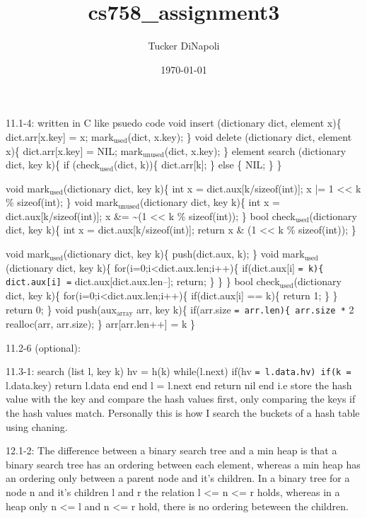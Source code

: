 \documentclass[11pt]{article}
\author{Tucker DiNapoli}
\date{\today}
\title{cs758\_assignment3}
\begin{document}
\maketitle
\tableofcontents

11.1-4: written in C like psuedo code
void insert (dictionary dict, element x)\{
  dict.arr[x.key] = x;
  mark$_{\text{used}}$(dict, x.key);
\}
void delete (dictionary dict, element x)\{
  dict.arr[x.key] = NIL;
  mark$_{\text{unused}}$(dict, x.key);
\}
element search (dictionary dict, key k)\{
  if (check$_{\text{used}}$(dict, k))\{
    dict.arr[k];
  \} else \{
    NIL;
  \}
\}


void mark$_{\text{used}}$(dictionary dict, key k)\{
  int x = dict.aux[k/sizeof(int)];
  x |= 1 << k \% sizeof(int);
\}
void mark$_{\text{unused}}$(dictionary dict, key k)\{
  int x = dict.aux[k/sizeof(int)];
  x \&=  \textasciitilde{}(1 << k \% sizeof(int));
\}
bool check$_{\text{used}}$(dictionary dict, key k)\{
  int x = dict.aux[k/sizeof(int)];
  return x \& (1 << k \% sizeof(int));
\}


void mark$_{\text{used}}$(dictionary dict, key k)\{
  push(dict.aux, k);
\}
void mark$_{\text{used}}$(dictionary dict, key k)\{
  for(i=0;i<dict.aux.len;i++)\{
    if(dict.aux[i] \texttt{= k)\{
      dict.aux[i] =} dict.aux[dict.aux.len--];
      return;
    \}
   \}
\}
bool check$_{\text{used}}$(dictionary dict, key k)\{
  for(i=0;i<dict.aux.len;i++)\{
    if(dict.aux[i] == k)\{
     return 1;
    \}
  \}
  return 0;
\}
void push(aux$_{\text{array}}$ arr, key k)\{
  if(arr.size \texttt{= arr.len)\{
    arr.size *} 2
    realloc(arr, arr.size);
  \}
  arr[arr.len++] = k
\}


11.2-6 (optional):

11.3-1:
search (list l, key k)
  hv = h(k)
  while(l.next)
   if(hv \texttt{= l.data.hv)
    if(k =} l.data.key)
      return l.data
    end
   end
   l = l.next
  end
  return nil
end
i.e store the hash value with the key and compare the hash values first, only
comparing the keys if the hash values match. Personally this is how I search
the buckets of a hash table using chaning.

12.1-2:
The difference between a binary search tree and a min heap is that a binary
search tree has an ordering between each element, whereas a min heap has an
ordering only between a parent node and it's children. In a binary tree for a
node n and it's children l and r the relation l <= n <= r holds, whereas in a
heap only n <= l and n <= r hold, there is no ordering beteween the children.
\end{document}
